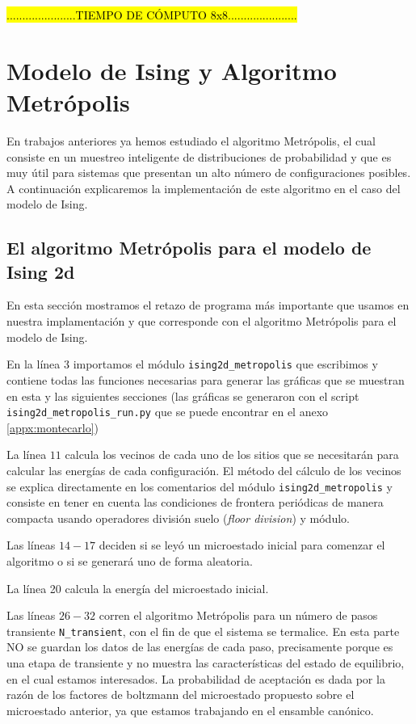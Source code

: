 \documentclass[%
 reprint,
 amsmath,amssymb,
 aps,
 pra,
]{revtex4-2}
\begin{document}
	\hl{......................TIEMPO DE CÓMPUTO 8x8......................}

\section{Modelo de Ising y Algoritmo Metrópolis\label{sec:metropolis}}

En trabajos anteriores ya hemos estudiado el algoritmo Metrópolis, el cual consiste en un muestreo inteligente de distribuciones de probabilidad y que es muy útil para sistemas que presentan un alto número de configuraciones posibles. A continuación explicaremos la implementación de este algoritmo en el caso del modelo de Ising.

	\subsection{El algoritmo Metrópolis para el modelo de Ising 2d\label{subsec:metropolis-algoritmo}}
	
	En esta sección mostramos el retazo de programa más importante que usamos en nuestra implamentación y que corresponde con el algoritmo Metrópolis para el modelo de Ising.

	En la línea 3 importamos el módulo \texttt{ising2d_metropolis} que escribimos y contiene todas las funciones necesarias para generar las gráficas que se muestran en esta y las siguientes secciones (las gráficas se generaron con el script \texttt{ising2d_metropolis_run.py} que se puede encontrar en el anexo \ref{appx:montecarlo})

	La línea $11$ calcula los vecinos de cada uno de los sitios que se necesitarán para calcular las energías de cada configuración. El método del cálculo de los vecinos se explica directamente en los comentarios del módulo \texttt{ising2d_metropolis} y consiste en tener en cuenta las condiciones de frontera periódicas de manera compacta usando operadores división suelo (\textit{floor division}) y módulo.

	Las líneas $14-17$ deciden si se leyó un microestado inicial para comenzar el algoritmo o si se generará uno de forma aleatoria.

	La línea 20 calcula la energía del microestado inicial.

	Las líneas $26-32$ corren el algoritmo Metrópolis para un número de pasos transiente \texttt{N_transient}, con el fin de que el sistema se termalice. En esta parte NO se guardan los datos de las energías de cada paso, precisamente porque es una etapa de transiente y no muestra las características del estado de equilibrio, en el cual estamos interesados. La probabilidad de aceptación es dada por la razón de los factores de boltzmann del microestado propuesto sobre el microestado anterior, ya que estamos trabajando en el ensamble canónico.
\end{document}
